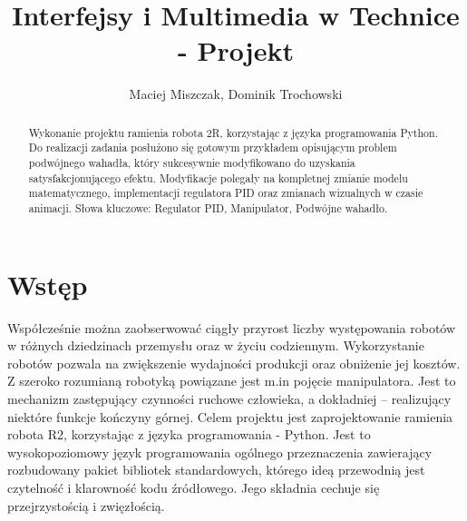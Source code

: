 \documentclass[fleqn,10pt]{physiome}
\title{Interfejsy i Multimedia w Technice - Projekt}
\author[]{Maciej Miszczak, Dominik Trochowski}
\begin{document}
\maketitle
\renewcommand{\abstractname}{Streszczenie}
\begin{abstract}
    Wykonanie projektu ramienia robota 2R, korzystając z języka programowania Python. Do realizacji zadania posłużono się gotowym przykładem opisującym problem podwójnego wahadła, który sukcesywnie modyfikowano do uzyskania satysfakcjonującego efektu. Modyfikacje polegały na kompletnej zmianie modelu matematycznego, implementacji regulatora PID oraz zmianach wizualnych w czasie animacji.
    \newline
    \newline
    Słowa kluczowe: Regulator PID, Manipulator, Podwójne wahadło.
\end{abstract}



\section{Wstęp}
    Współcześnie można zaobserwować ciągły przyrost liczby występowania robotów w różnych dziedzinach przemysłu oraz  w życiu codziennym. Wykorzystanie robotów pozwala na zwiększenie wydajności produkcji oraz obniżenie jej kosztów. Z szeroko rozumianą robotyką powiązane jest m.in pojęcie manipulatora. Jest to mechanizm zastępujący czynności ruchowe człowieka, a dokładniej – realizujący niektóre funkcje kończyny górnej.
    Celem projektu jest zaprojektowanie ramienia robota R2, korzystając z języka programowania - Python. Jest to wysokopoziomowy język programowania ogólnego przeznaczenia zawierający rozbudowany pakiet bibliotek standardowych, którego ideą przewodnią jest czytelność i klarowność kodu źródłowego. Jego składnia cechuje się przejrzystością i zwięzłością.
	
   
\end{document}
